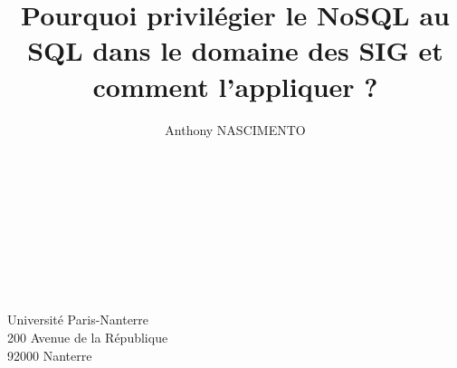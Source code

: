 \documentclass[12pt, a4paper, french, openright]{report}
\title{Pourquoi privilégier le NoSQL au SQL dans le domaine des SIG et comment l'appliquer ?}
\author{Anthony NASCIMENTO}
\begin{document}


\newpage
~
\thispagestyle{empty}
\newpage

\thispagestyle{empty}


~
\thispagestyle{empty}

\newpage
~
\thispagestyle{empty}

\setcounter{tocdepth}{1}
\tableofcontents
\thispagestyle{empty}
\setcounter{page}{0}

\newpage
~
\thispagestyle{empty}
\setcounter{page}{0}
\newpage













\newpage

\printbibliography[
heading=bibintoc,
title={Bibliographie}
]
\clearpage %
\listoffigures
\clearpage %
\listoftables
\clearpage %

\newpage
\printglossaries

\newpage
\thispagestyle{empty}
\vspace*{\fill}
\begin{center}
  Université Paris-Nanterre\\
  200 Avenue de la République\\
  92000 Nanterre
\end{center}
\vspace*{\fill}
\end{document}
